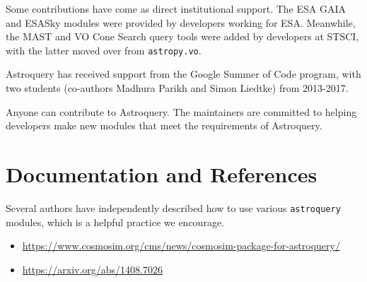 \documentclass[twocolumn]{aastex61}
\begin{document}
Some contributions have come as direct institutional support.  The ESA GAIA and
ESASky modules were provided by developers working for ESA.  Meanwhile,
the MAST and VO Cone Search query tools were added by developers at STSCI,
with the latter moved over from \texttt{astropy.vo}.

Astroquery has received support from the Google Summer of Code
program, with two students (co-authors Madhura Parikh and Simon Liedtke)
from 2013-2017.

Anyone can contribute to Astroquery.  The maintainers are committed to helping
developers make new modules that meet the requirements of Astroquery.

\section{Documentation and References}
Several authors have independently described how to use various \texttt{astroquery}
modules, which is a helpful practice we encourage.

\begin{itemize}
    \item \url{https://www.cosmosim.org/cms/news/cosmosim-package-for-astroquery/}
    \item \url{https://arxiv.org/abs/1408.7026}
\end{itemize}
\end{document}
